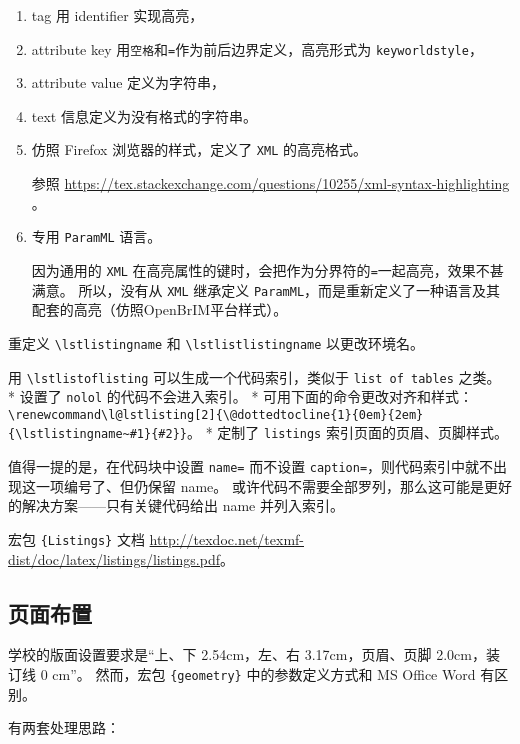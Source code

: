 \documentclass[../Main/thesis.tex]{subfiles}
\begin{document}
\begin{enumerate}
\def\labelenumi{\arabic{enumi}.}
\item
  tag 用 identifier 实现高亮，
\item
  attribute key 用\texttt{空格}和\texttt{=}作为前后边界定义，高亮形式为
  \texttt{keyworldstyle}，
\item
  attribute value 定义为字符串，
\item
  text 信息定义为没有格式的字符串。
\item
  仿照 Firefox 浏览器的样式，定义了 \texttt{XML} 的高亮格式。

  参照
  \url{https://tex.stackexchange.com/questions/10255/xml-syntax-highlighting}
  。
\item
  专用 \texttt{ParamML} 语言。

  因为通用的 \texttt{XML}
  在高亮属性的键时，会把作为分界符的\texttt{=}一起高亮，效果不甚满意。
  所以，没有从 \texttt{XML} 继承定义
  \texttt{ParamML}，而是重新定义了一种语言及其配套的高亮（仿照OpenBrIM平台样式）。
\end{enumerate}

重定义 \texttt{\textbackslash{}lstlistingname} 和
\texttt{\textbackslash{}lstlistlistingname} 以更改环境名。

用 \texttt{\textbackslash{}lstlistoflisting}
可以生成一个代码索引，类似于 \texttt{list\ of\ tables} 之类。 * 设置了
\texttt{nolol} 的代码不会进入索引。 * 可用下面的命令更改对齐和样式：
\texttt{\textbackslash{}renewcommand\textbackslash{}l@lstlisting{[}2{]}\{\textbackslash{}@dottedtocline\{1\}\{0em\}\{2em\}\{\textbackslash{}lstlistingname\textasciitilde{}\#1\}\{\#2\}\}}。
* 定制了 \texttt{listings} 索引页面的页眉、页脚样式。

值得一提的是，在代码块中设置 \texttt{name=} 而不设置
\texttt{caption=}，则代码索引中就不出现这一项编号了、但仍保留 name。
或许代码不需要全部罗列，那么这可能是更好的解决方案------只有关键代码给出
name 并列入索引。

宏包 \texttt{\{Listings\}} 文档
\url{http://texdoc.net/texmf-dist/doc/latex/listings/listings.pdf}。

\subsection{页面布置}

学校的版面设置要求是``上、下 2.54cm，左、右 3.17cm，页眉、页脚
2.0cm，装订线 0 cm''。 然而，宏包 \texttt{\{geometry\}}
中的参数定义方式和 MS Office Word 有区别。

有两套处理思路：
\end{document}
